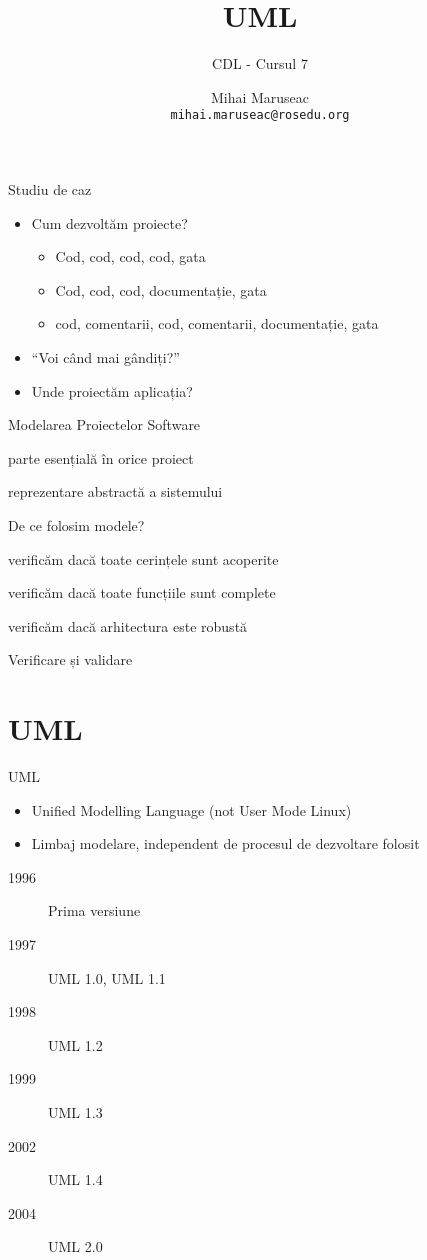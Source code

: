 \documentclass{beamer}
\title[]{UML}
\subtitle{CDL - Cursul 7}
\institute[]{ROSEdu}
\author[]{Mihai Maruseac \\ \texttt{mihai.maruseac@rosedu.org}}
\begin{document}
\maketitle

\begin{frame}{Studiu de caz}
  \begin{itemize}[<+->]
    \item Cum dezvoltăm proiecte?
    \begin{itemize}[<+->]
      \item Cod, cod, cod, cod, gata
      \item Cod, cod, cod, documentație, gata
      \item cod, comentarii, cod, comentarii, documentație, gata
    \end{itemize}
    \item ``Voi când mai gândiți?''
    \item Unde proiectăm aplicația?
  \end{itemize}
\end{frame}

\begin{frame}{Modelarea Proiectelor Software}
  \begin{description}[<+->]
    \item[Modelarea:] parte esențială în orice proiect
    \item[Model:] reprezentare abstractă a sistemului
  \end{description}
  De ce folosim modele?
  \begin{description}[<+->]
    \item[Înainte] verificăm dacă toate cerințele sunt acoperite
    \item[Înainte] verificăm dacă toate funcțiile sunt complete
    \item[Înainte] verificăm dacă arhitectura este robustă
    \item[După] Verificare și validare
  \end{description}
\end{frame}

\section{UML}

\begin{frame}{UML}
  \begin{itemize}[<+->]
    \item Unified Modelling Language (not User Mode Linux)
    \item Limbaj modelare, independent de procesul de dezvoltare folosit
  \end{itemize}
  \begin{description}
    \item[1996] Prima versiune
    \item[1997] UML 1.0, UML 1.1
    \item[1998] UML 1.2
    \item[1999] UML 1.3
    \item[2002] UML 1.4
    \item[2004] UML 2.0
  \end{description}
\end{frame}
\end{document}
